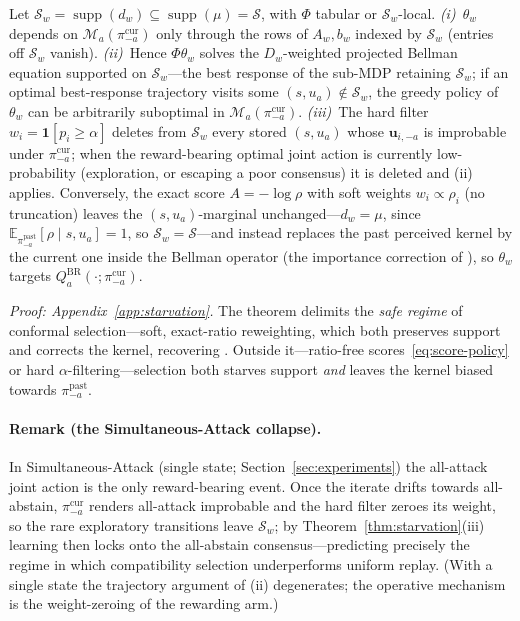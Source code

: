 \documentclass[sigconf]{aamas}
\newcommand{\umai}{\mathbf{u}_{i,-a}}
\newcommand{\picur}{\pi^{\mathrm{cur}}_{-a}}
\newcommand{\pipast}{\pi^{\mathrm{past}}_{-a}}
\newcommand{\Qbr}{Q^{\mathrm{BR}}_{a}}
\newcommand{\indic}[1]{\mathbf{1}\!\left[#1\right]}
\DeclareMathOperator{\supp}{supp}
\newcommand{\Dw}{D_{w}}
\newcommand{\dw}{d_{w}}
\begin{document}
\begin{theorem}
\label{thm:starvation}
Let $\mathcal{S}_w=\supp(\dw)\subseteq\supp(\mu)=\mathcal{S}$, with $\Phi$ tabular
or $\mathcal{S}_w$-local.
\emph{(i)}~$\theta_w$ depends on $\mathcal{M}_a(\picur)$ only through the rows of
$A_w,b_w$ indexed by $\mathcal{S}_w$ (entries off $\mathcal{S}_w$ vanish).
\emph{(ii)}~Hence $\Phi\theta_w$ solves the $\Dw$-weighted projected Bellman
equation supported on $\mathcal{S}_w$---the best response of the sub-MDP retaining
$\mathcal{S}_w$; if an optimal best-response trajectory visits some
$(s,u_a)\notin\mathcal{S}_w$, the greedy policy of $\theta_w$ can be arbitrarily
suboptimal in $\mathcal{M}_a(\picur)$.
\emph{(iii)}~The hard filter $w_i=\indic{p_i\ge\alpha}$ deletes from $\mathcal{S}_w$
every stored $(s,u_a)$ whose $\umai$ is improbable under $\picur$; when the
reward-bearing optimal joint action is currently low-probability (exploration, or
escaping a poor consensus) it is deleted and (ii) applies. Conversely, the exact
score $A=-\log\rho$ with soft weights $w_i\propto\rho_i$ (no truncation) leaves the
$(s,u_a)$-marginal unchanged---$\dw=\mu$, since
$\mathbb{E}_{\pipast}[\rho\mid s,u_a]=1$, so $\mathcal{S}_w=\mathcal{S}$---and
instead replaces the past perceived kernel by the current one inside the Bellman
operator (the importance correction of \citet{foerster2017stabilising}), so
$\theta_w$ targets $\Qbr(\cdot;\picur)$.
\end{theorem}
\noindent\emph{Proof: Appendix~\ref{app:starvation}.} The theorem delimits the
\emph{safe regime} of conformal selection---soft, exact-ratio reweighting, which
both preserves support and corrects the kernel, recovering
\citealp{foerster2017stabilising}. Outside it---ratio-free
scores~\eqref{eq:score-policy} or hard $\alpha$-filtering---selection both starves
support \emph{and} leaves the kernel biased towards $\pipast$.

\paragraph{Remark (the Simultaneous-Attack collapse).} In Simultaneous-Attack
(single state; Section~\ref{sec:experiments}) the all-attack joint action is the
only reward-bearing event. Once the iterate drifts towards all-abstain, $\picur$
renders all-attack improbable and the hard filter zeroes its weight, so the rare
exploratory transitions leave $\mathcal{S}_w$; by Theorem~\ref{thm:starvation}(iii)
learning then locks onto the all-abstain consensus---predicting precisely the
regime in which compatibility selection underperforms uniform replay. (With a
single state the trajectory argument of (ii) degenerates; the operative mechanism
is the weight-zeroing of the rewarding arm.)
\end{document}
